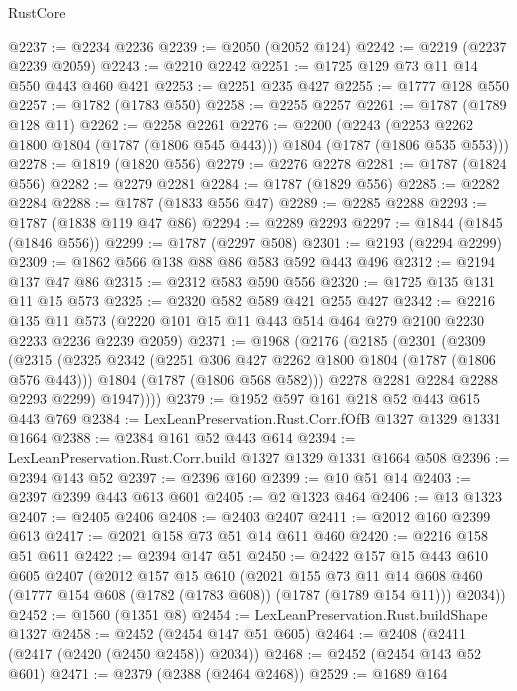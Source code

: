 \begin{lexlean}{RustCore}
\begin{coremodule}
@2237 := @2234 @2236
@2239 := @2050 (@2052 @124)
@2242 := @2219 (@2237 @2239 @2059)
@2243 := @2210 @2242
@2251 := @1725 @129 @73 @11 @14 @550 @443 @460 @421
@2253 := @2251 @235 @427
@2255 := @1777 @128 @550
@2257 := @1782 (@1783 @550)
@2258 := @2255 @2257
@2261 := @1787 (@1789 @128 @11)
@2262 := @2258 @2261
@2276 := @2200
    (@2243 (@2253 @2262 @1800 @1804 (@1787 (@1806 @545 @443))) @1804 (@1787 (@1806 @535 @553)))
@2278 := @1819 (@1820 @556)
@2279 := @2276 @2278
@2281 := @1787 (@1824 @556)
@2282 := @2279 @2281
@2284 := @1787 (@1829 @556)
@2285 := @2282 @2284
@2288 := @1787 (@1833 @556 @47)
@2289 := @2285 @2288
@2293 := @1787 (@1838 @119 @47 @86)
@2294 := @2289 @2293
@2297 := @1844 (@1845 (@1846 @556))
@2299 := @1787 (@2297 @508)
@2301 := @2193 (@2294 @2299)
@2309 := @1862 @566 @138 @88 @86 @583 @592 @443 @496
@2312 := @2194 @137 @47 @86
@2315 := @2312 @583 @590 @556
@2320 := @1725 @135 @131 @11 @15 @573
@2325 := @2320 @582 @589 @421 @255 @427
@2342 := @2216
    @135
    @11
    @573
    (@2220 @101 @15 @11 @443 @514 @464 @279 @2100 @2230 @2233 @2236 @2239 @2059)
@2371 := @1968
    (@2176
      (@2185
        (@2301
          (@2309
            (@2315
              (@2325
                @2342
                (@2251 @306 @427 @2262 @1800 @1804 (@1787 (@1806 @576 @443)))
                @1804
                (@1787 (@1806 @568 @582)))
              @2278
              @2281
              @2284
              @2288
              @2293
              @2299)
            @1947))))
@2379 := @1952 @597 @161 @218 @52 @443 @615 @443 @769
@2384 := LexLeanPreservation.Rust.Corr.fOfB @1327 @1329 @1331 @1664
@2388 := @2384 @161 @52 @443 @614
@2394 := LexLeanPreservation.Rust.Corr.build @1327 @1329 @1331 @1664 @508
@2396 := @2394 @143 @52
@2397 := @2396 @160
@2399 := @10 @51 @14
@2403 := @2397 @2399 @443 @613 @601
@2405 := @2 @1323 @464
@2406 := @13 @1323
@2407 := @2405 @2406
@2408 := @2403 @2407
@2411 := @2012 @160 @2399 @613
@2417 := @2021 @158 @73 @51 @14 @611 @460
@2420 := @2216 @158 @51 @611
@2422 := @2394 @147 @51
@2450 := @2422
    @157
    @15
    @443
    @610
    @605
    @2407
    (@2012
      @157
      @15
      @610
      (@2021
        @155
        @73
        @11
        @14
        @608
        @460
        (@1777 @154 @608 (@1782 (@1783 @608)) (@1787 (@1789 @154 @11)))
        @2034))
@2452 := @1560 (@1351 @8)
@2454 := LexLeanPreservation.Rust.buildShape @1327
@2458 := @2452 (@2454 @147 @51 @605)
@2464 := @2408 (@2411 (@2417 (@2420 (@2450 @2458)) @2034))
@2468 := @2452 (@2454 @143 @52 @601)
@2471 := @2379 (@2388 (@2464 @2468))
@2529 := @1689
    @164

\end{coremodule}
\end{lexlean}
